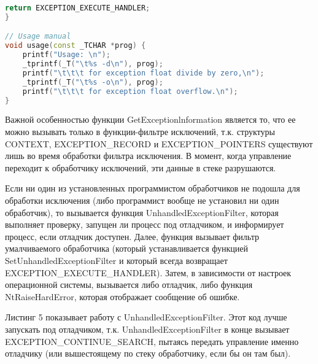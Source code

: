 \documentclass[a4paper,12pt]{article} %
\begin{document}
\begin{lstlisting}[language=C++, caption={Программная генерация исключения при помощи функции RaiseException}]
	return EXCEPTION_EXECUTE_HANDLER;
}

// Usage manual
void usage(const _TCHAR *prog) {
	printf("Usage: \n");
	_tprintf(_T("\t%s -d\n"), prog);
	printf("\t\t\t for exception float divide by zero,\n");
	_tprintf(_T("\t%s -o\n"), prog);
	printf("\t\t\t for exception float overflow.\n");
}
\end{lstlisting}

Важной особенностью функции GetExceptionlnformation является то, что ее можно вызывать только в функции-фильтре исключений, т.к. структуры CONTEXT, EXCEPTION\_RECORD и EXCEPTION\_POINTERS существуют лишь во время обработки фильтра исключения. В момент, когда управление переходит к обработчику исключений, эти данные в стеке разрушаются.
\newpage

Если ни один из установленных программистом обработчиков не подошла для обработки исключения (либо программист вообще не установил ни один обработчик), то вызывается функция UnhandledExceptionFilter, которая выполняет проверку, запущен ли процесс под отладчиком, и информирует процесс, если отладчик доступен. Далее, функция вызывает фильтр умалчиваемого обработчика (который устанавливается функцией \\ SetUnhandledExceptionFilter и который всегда возвращает EXCEPTION\_EXECUTE\_HANDLER). Затем, в зависимости от настроек операционной системы, вызывается либо отладчик, либо функция NtRaiseHardError, которая отображает сообщение об ошибке. 

Листинг 5 показывает работу с UnhandledExceptionFilter. Этот код лучше запускать под отладчиком, т.к. UnhandledExceptionFilter в конце вызывает EXCEPTION\_CONTINUE\_SEARCH, пытаясь передать управление именно отладчику (или вышестоящему по стеку обработчику, если бы он там был).
\end{document}
